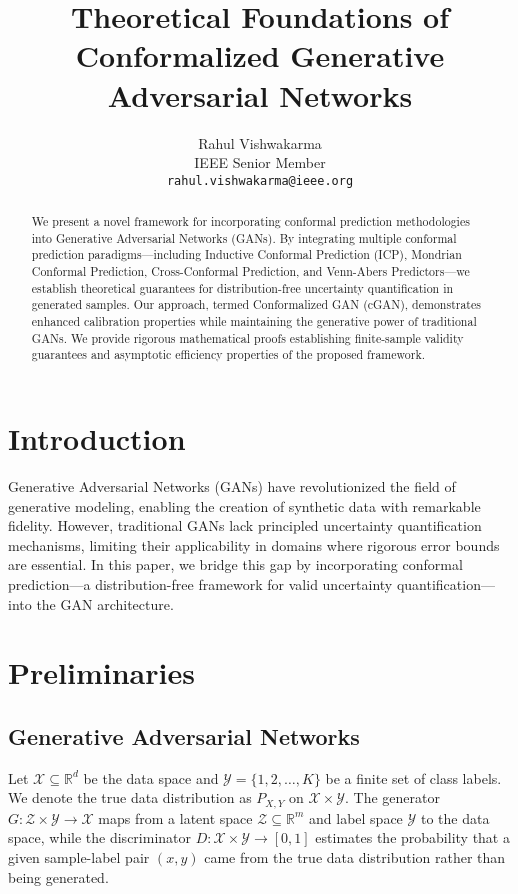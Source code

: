 \documentclass{article}
\title{Theoretical Foundations of Conformalized Generative Adversarial Networks}
\author{
  Rahul Vishwakarma\\
  IEEE Senior Member\\
  \texttt{rahul.vishwakarma@ieee.org}
}
\theoremstyle{plain}
\theoremstyle{definition}
\theoremstyle{remark}
\begin{document}
\maketitle

\begin{abstract}
We present a novel framework for incorporating conformal prediction methodologies into Generative Adversarial Networks (GANs). By integrating multiple conformal prediction paradigms—including Inductive Conformal Prediction (ICP), Mondrian Conformal Prediction, Cross-Conformal Prediction, and Venn-Abers Predictors—we establish theoretical guarantees for distribution-free uncertainty quantification in generated samples. Our approach, termed Conformalized GAN (cGAN), demonstrates enhanced calibration properties while maintaining the generative power of traditional GANs. We provide rigorous mathematical proofs establishing finite-sample validity guarantees and asymptotic efficiency properties of the proposed framework.
\end{abstract}

\section{Introduction}
Generative Adversarial Networks (GANs) have revolutionized the field of generative modeling, enabling the creation of synthetic data with remarkable fidelity. However, traditional GANs lack principled uncertainty quantification mechanisms, limiting their applicability in domains where rigorous error bounds are essential. In this paper, we bridge this gap by incorporating conformal prediction—a distribution-free framework for valid uncertainty quantification—into the GAN architecture.

\section{Preliminaries}
\subsection{Generative Adversarial Networks}
Let $\mathcal{X} \subseteq \mathbb{R}^d$ be the data space and $\mathcal{Y} = \{1, 2, \ldots, K\}$ be a finite set of class labels. We denote the true data distribution as $P_{X,Y}$ on $\mathcal{X} \times \mathcal{Y}$. The generator $G: \mathcal{Z} \times \mathcal{Y} \rightarrow \mathcal{X}$ maps from a latent space $\mathcal{Z} \subseteq \mathbb{R}^m$ and label space $\mathcal{Y}$ to the data space, while the discriminator $D: \mathcal{X} \times \mathcal{Y} \rightarrow [0, 1]$ estimates the probability that a given sample-label pair $(x, y)$ came from the true data distribution rather than being generated.
\end{document}
